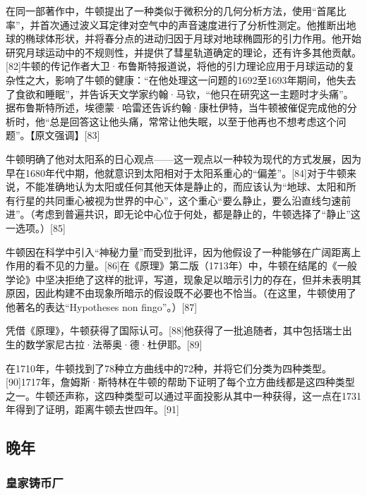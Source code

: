 在同一部著作中，牛顿提出了一种类似于微积分的几何分析方法，使用“首尾比率”，并首次通过波义耳定律对空气中的声音速度进行了分析性测定。他推断出地球的椭球体形状，并将春分点的进动归因于月球对地球椭圆形的引力作用。他开始研究月球运动中的不规则性，并提供了彗星轨道确定的理论，还有许多其他贡献。[82]牛顿的传记作者大卫·布鲁斯特报道说，将他的引力理论应用于月球运动的复杂性之大，影响了牛顿的健康：“在他处理这一问题的1692至1693年期间，他失去了食欲和睡眠”，并告诉天文学家约翰·马钦，“他只在研究这一主题时才头痛”。据布鲁斯特所述，埃德蒙·哈雷还告诉约翰·康杜伊特，当牛顿被催促完成他的分析时，他“总是回答这让他头痛，常常让他失眠，以至于他再也不想考虑这个问题”。【原文强调】[83]

牛顿明确了他对太阳系的日心观点——这一观点以一种较为现代的方式发展，因为早在1680年代中期，他就意识到太阳相对于太阳系重心的“偏差”。[84]对于牛顿来说，不能准确地认为太阳或任何其他天体是静止的，而应该认为“地球、太阳和所有行星的共同重心被视为世界的中心”，这个重心“要么静止，要么沿直线匀速前进”。（考虑到普遍共识，即无论中心位于何处，都是静止的，牛顿选择了“静止”这一选项。）[85]

牛顿因在科学中引入“神秘力量”而受到批评，因为他假设了一种能够在广阔距离上作用的看不见的力量。[86]在《原理》第二版（1713年）中，牛顿在结尾的《一般学论》中坚决拒绝了这样的批评，写道，现象足以暗示引力的存在，但并未表明其原因，因此构建不由现象所暗示的假设既不必要也不恰当。（在这里，牛顿使用了他著名的表达“Hypotheses non fingo”。）[87]

凭借《原理》，牛顿获得了国际认可。[88]他获得了一批追随者，其中包括瑞士出生的数学家尼古拉·法蒂奥·德·杜伊耶。[89]

在1710年，牛顿找到了78种立方曲线中的72种，并将它们分类为四种类型。[90]1717年，詹姆斯·斯特林在牛顿的帮助下证明了每个立方曲线都是这四种类型之一。牛顿还声称，这四种类型可以通过平面投影从其中一种获得，这一点在1731年得到了证明，距离牛顿去世四年。[91]
\subsection{晚年}   
\subsubsection{皇家铸币厂}
